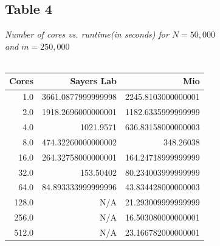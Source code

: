 \documentclass[letterpaper, 12pt]{article}
\begin{document}
	\subsection*{Table 4} \small\textit{Number of cores vs. runtime(in seconds) for $N=50,000$\\ and $m=250,000$} \\\\
	\normalsize
	\begin{tabular}{r||r|r}
	\hline
		Cores              &Sayers Lab                     &Mio \\ 
	\hline
		  1.0      &3661.0877999999998      &2245.8103000000001 \\ 
		  2.0      &1918.2696000000001      &1182.6335999999999 \\ 
		  4.0               &1021.9571      &636.83158000000003 \\ 
		  8.0      &474.32260000000002               &348.26038 \\ 
		 16.0      &264.32758000000001      &164.24718999999999 \\ 
		 32.0               &153.50402      &80.234003999999999 \\ 
		 64.0      &84.893333999999996      &43.834428000000003 \\ 
		128.0                     &N/A      &21.293009999999999 \\ 
		256.0                     &N/A      &16.503080000000001 \\ 
		512.0                     &N/A      &23.166782000000001 \\ 
		\hline
	\end{tabular}
	
\end{document}
